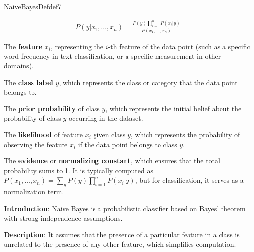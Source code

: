 \documentclass[
  12 pt,
  a4paper,
]{book}
\numberwithin{equation}{section}
\theoremstyle{plain}      %
\theoremstyle{definition} %
\theoremstyle{remark}     %
\theoremstyle{note}         %
\begin{document}
\vspace*{\fill}
\begin{a_def_eq}{NaiveBayesDef}{def7} 

\begin{align}\label{naivebayes}
P(y | x_1, \ldots, x_n) = \frac{P(y) \prod_{i=1}^{n} P(x_i | y)}{P(x_1, \ldots, x_n)}
\end{align}

\begin{description}[align=left, labelwidth=2.5cm, labelsep=0em, leftmargin=2.5cm] 
    \item[$x_i$] The \textbf{feature} \( x_i \), representing the \(i\)-th feature of the data point (such as a specific word frequency in text classification, or a specific measurement in other domains).
    \vspace{0.5\baselineskip}
    \item[$y$] The \textbf{class label} \( y \), which represents the class or category that the data point belongs to.
    \vspace{0.5\baselineskip}
    \item[$P(y)$] The \textbf{prior probability} of class \( y \), which represents the initial belief about the probability of class \( y \) occurring in the dataset.
    \vspace{0.5\baselineskip}
    \item[$P(x_i | y)$] The \textbf{likelihood} of feature \( x_i \) given class \( y \), which represents the probability of observing the feature \( x_i \) if the data point belongs to class \( y \).
    \vspace{0.5\baselineskip}
    \item[$P(x_1, \ldots, x_n)$] The \textbf{evidence} or \textbf{normalizing constant}, which ensures that the total probability sums to 1. It is typically computed as \( P(x_1, \ldots, x_n) = \sum_y P(y) \prod_{i=1}^{n} P(x_i | y) \), but for classification, it serves as a normalization term.
\end{description}

\end{a_def_eq}

\hfill\break

\textbf{Introduction}: Naive Bayes is a probabilistic classifier based
on Bayes' theorem with strong independence assumptions.

\textbf{Description}: It assumes that the presence of a particular
feature in a class is unrelated to the presence of any other feature,
which simplifies computation.
\end{document}
